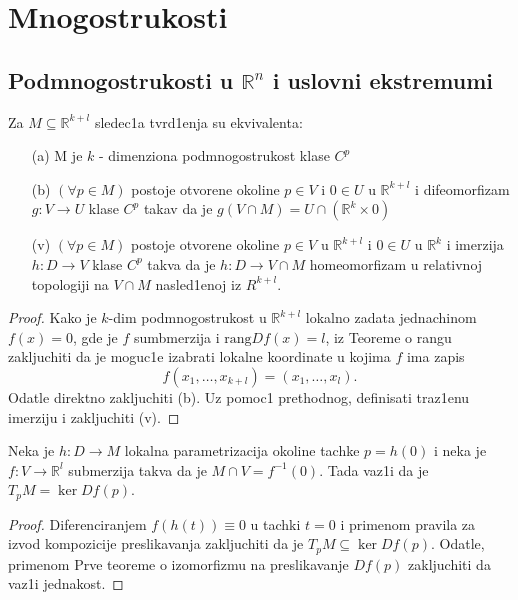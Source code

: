 \documentclass[a4paper,12pt]{article}
\newcommand{\R}{\mathbb{R}}
\newcommand{\psj}{\subseteq}
\newcommand{\rang}{\mathrm{rang}}
\begin{document}
\section{Mnogostrukosti}

\subsection{Podmnogostrukosti u $\R^n$ i uslovni ekstremumi}

\begin{tvr}
Za $M \psj \R^{k+l}$ sledec1a tvrd1enja su ekvivalenta:
\begin{itemize}
\item[(a)] M je $k$ - dimenziona podmnogostrukost klase $C^p$
\item[(b)] $(\forall p \in M)$ postoje otvorene okoline $p \in V$ i $0 \in U$ u $\R^{k+l}$ i difeomorfizam $g: V \to U$ klase $C^p$ takav da je $g(V \cap M) = U \cap (\R^k \times {0})$
\item[(v)] $(\forall p \in M)$ postoje otvorene okoline $p \in V$  u $\R^{k+l}$ i $0 \in U$ u $\R^k$ i imerzija $h: D \to V$ klase $C^p$ takva da je $h: D \to V \cap M$ homeomorfizam u relativnoj topologiji na $V \cap M$ nasled1enoj iz $R^{k+l}$.
\end{itemize}
\end{tvr}
\begin{proof}
Kako je $k$-dim podmnogostrukost u $\R^{k+l}$ lokalno zadata jednachinom $f(x) = 0$, gde je $f$ sumbmerzija i $\rang Df(x) = l$, iz Teoreme o rangu zakljuchiti da je moguc1e izabrati lokalne koordinate u kojima $f$ ima zapis 
\[ f(x_1, \dots , x_{k+l}) = (x_1, \dots, x_l). \] Odatle direktno zakljuchiti (b). Uz pomoc1 prethodnog, definisati traz1enu imerziju i zakljuchiti (v).
\end{proof}

\begin{tvr}
Neka je $h:D \to M$ lokalna parametrizacija okoline tachke $p = h(0)$ i neka je $f: V \to \R^l$ submerzija takva da je $M \cap V = f^{-1} (0)$. Tada vaz1i da je $T_p M = \ker D f(p)$.
\end{tvr}
\begin{proof}
Diferenciranjem $f(h(t)) \equiv 0$ u tachki $t = 0$ i primenom pravila za izvod kom\-po\-zi\-ci\-je preslikavanja zakljuchiti da je $T_p M \psj \ker Df(p)$. Odatle, primenom Prve teoreme o i\-zo\-mor\-fi\-zmu na preslikavanje $Df(p)$ zakljuchiti da vaz1i jednakost.
\end{proof}
\end{document}
